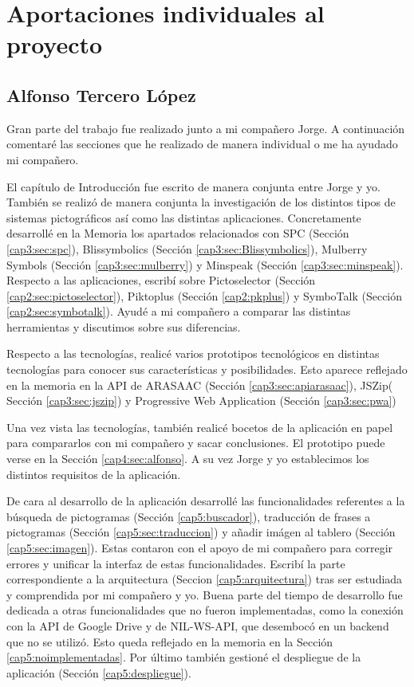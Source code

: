 \chapter{Aportaciones individuales al proyecto}
\label{cap:Aportacionesindividuales}

\section{Alfonso Tercero López}

Gran parte del trabajo fue realizado junto a mi compañero Jorge. A continuación comentaré las secciones que he realizado de manera individual o me ha ayudado mi compañero.

El capítulo de Introducción fue escrito de manera conjunta entre Jorge y yo. También se realizó de manera conjunta la investigación de los distintos tipos de sistemas pictográficos así como las distintas aplicaciones. Concretamente desarrollé en la Memoria los apartados relacionados con SPC (Sección \ref{cap3:sec:spc}), Blissymbolics (Sección \ref{cap3:sec:Blissymbolics}), Mulberry Symbols (Sección \ref{cap3:sec:mulberry}) y Minspeak (Sección \ref{cap3:sec:minspeak}). Respecto a las aplicaciones, escribí sobre Pictoselector (Sección \ref{cap2:sec:pictoselector}), Piktoplus (Sección \ref{cap2:pkplus}) y SymboTalk (Sección \ref{cap2:sec:symbotalk}). Ayudé a mi compañero a comparar las distintas herramientas y discutimos sobre sus diferencias.

Respecto a las tecnologías, realicé varios prototipos tecnológicos en distintas tecnologías para conocer sus características y posibilidades. Esto aparece reflejado en la memoria en la API de ARASAAC (Sección \ref{cap3:sec:apiarasaac}), JSZip( Sección \ref{cap3:sec:jszip}) y Progressive Web Application (Sección \ref{cap3:sec:pwa})

Una vez vista las tecnologías, también realicé bocetos de la aplicación en papel para compararlos con mi compañero y sacar conclusiones. El prototipo puede verse en la Sección \ref{cap4:sec:alfonso}. A su vez Jorge y yo establecimos los distintos requisitos de la aplicación. 

De cara al desarrollo de la aplicación desarrollé las funcionalidades referentes a la búsqueda de pictogramas (Sección \ref{cap5:buscador}), traducción de frases a pictogramas (Sección \ref{cap5:sec:traduccion}) y añadir imágen al tablero (Sección \ref{cap5:sec:imagen}). Estas contaron con el apoyo de mi compañero para corregir errores y unificar la interfaz de estas funcionalidades. Escribí la parte correspondiente a la arquitectura (Seccion \ref{cap5:arquitectura}) tras ser estudiada y comprendida por mi compañero y yo. Buena parte del tiempo de desarrollo fue dedicada a otras funcionalidades que no fueron implementadas, como la conexión con la API de Google Drive y  de NIL-WS-API, que desembocó en un backend que no se utilizó. Esto queda reflejado en la memoria en la Sección \ref{cap5:noimplementadas}. Por último también gestioné el despliegue de la aplicación (Sección \ref{cap5:despliegue}). 

